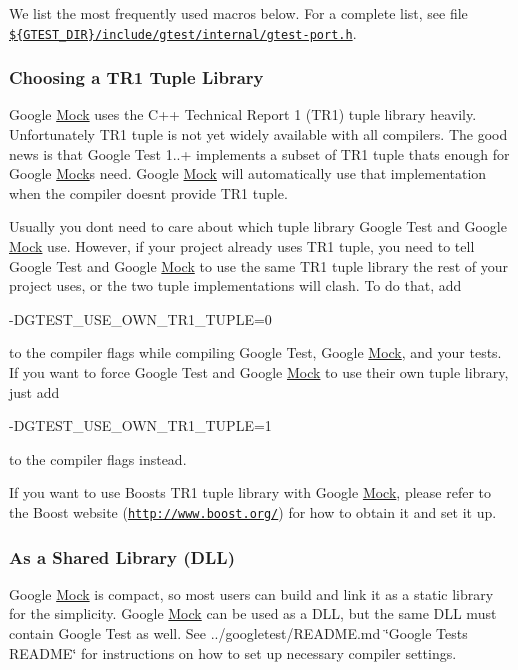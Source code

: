 We list the most frequently used macros below. For a complete list, see file \href{../googletest/include/gtest/internal/gtest-port.h}{\tt \$\{G\+T\+E\+S\+T\+\_\+\+D\+IR\}/include/gtest/internal/gtest-\/port.h}.

\subsubsection*{Choosing a T\+R1 Tuple Library}

Google \hyperlink{class_mock}{Mock} uses the C++ Technical Report 1 (T\+R1) tuple library heavily. Unfortunately T\+R1 tuple is not yet widely available with all compilers. The good news is that Google Test 1..+ implements a subset of T\+R1 tuple that\textquotesingle{}s enough for Google \hyperlink{class_mock}{Mock}\textquotesingle{}s need. Google \hyperlink{class_mock}{Mock} will automatically use that implementation when the compiler doesn\textquotesingle{}t provide T\+R1 tuple.

Usually you don\textquotesingle{}t need to care about which tuple library Google Test and Google \hyperlink{class_mock}{Mock} use. However, if your project already uses T\+R1 tuple, you need to tell Google Test and Google \hyperlink{class_mock}{Mock} to use the same T\+R1 tuple library the rest of your project uses, or the two tuple implementations will clash. To do that, add \begin{DoxyVerb}-DGTEST_USE_OWN_TR1_TUPLE=0
\end{DoxyVerb}


to the compiler flags while compiling Google Test, Google \hyperlink{class_mock}{Mock}, and your tests. If you want to force Google Test and Google \hyperlink{class_mock}{Mock} to use their own tuple library, just add \begin{DoxyVerb}-DGTEST_USE_OWN_TR1_TUPLE=1
\end{DoxyVerb}


to the compiler flags instead.

If you want to use Boost\textquotesingle{}s T\+R1 tuple library with Google \hyperlink{class_mock}{Mock}, please refer to the Boost website (\href{http://www.boost.org/}{\tt http\+://www.\+boost.\+org/}) for how to obtain it and set it up.

\subsubsection*{As a Shared Library (D\+LL)}

Google \hyperlink{class_mock}{Mock} is compact, so most users can build and link it as a static library for the simplicity. Google \hyperlink{class_mock}{Mock} can be used as a D\+LL, but the same D\+LL must contain Google Test as well. See ../googletest/\+R\+E\+A\+D\+ME.md \char`\"{}\+Google Test\textquotesingle{}s R\+E\+A\+D\+M\+E\char`\"{} for instructions on how to set up necessary compiler settings.

